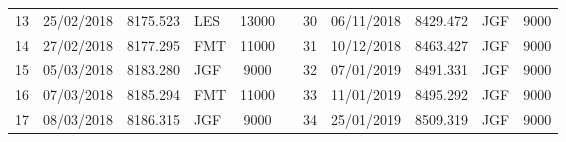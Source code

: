 \begin{table}[htbp]
\begin{tabular}{|c|c|c|p{1.715em}|c|r|c|c|c|p{1.715em}|c|}
\cline{1-5}\cline{7-11}    13    & 25/02/2018 & 8175.523 & LES   & 13000 &       & 30    & 06/11/2018 & 8429.472 & JGF   & 9000 \bigstrut\\
\cline{1-5}\cline{7-11}    14    & 27/02/2018 & 8177.295 & FMT   & 11000 &       & 31    & 10/12/2018 & 8463.427 & JGF   & 9000 \bigstrut\\
\cline{1-5}\cline{7-11}    15    & 05/03/2018 & 8183.280 & JGF   & 9000  &       & 32    & 07/01/2019 & 8491.331 & JGF   & 9000 \bigstrut\\
\cline{1-5}\cline{7-11}    16    & 07/03/2018 & 8185.294 & FMT   & 11000 &       & 33    & 11/01/2019 & 8495.292 & JGF   & 9000 \bigstrut\\
\cline{1-5}\cline{7-11}    17    & 08/03/2018 & 8186.315 & JGF   & 9000  &       & 34    & 25/01/2019 & 8509.319 & JGF   & 9000 \bigstrut\\
\cline{1-5}\cline{7-11}    \end{tabular}%
  \label{tab:addlabel}%
\end{table}%
